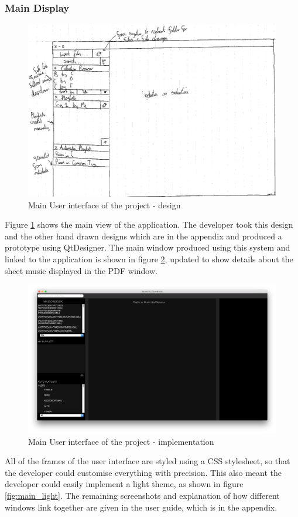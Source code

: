 \subsubsection{Main Display}
\begin{figure}[H]
\centering
    \includegraphics[width=500pt]{designs/main}
    \caption{Main User interface of the project - design}
    \label{fig:main_handdrawn}
\end{figure}
Figure \ref{fig:main_handdrawn} shows the main view of the application. The developer took this design and the other hand drawn designs which are in the appendix and produced a prototype using QtDesigner. The main window produced using this system and linked to the application is shown in figure \ref{fig:main}, updated to show details about the sheet music displayed in the PDF window. 
\begin{figure}[H]
	\centering
    \includegraphics[width=400pt]{designs/main_screenshot.png}
    \caption{Main User interface of the project - implementation}
    \label{fig:main}
\end{figure}
All of the frames of the user interface are styled using a CSS stylesheet, so that the developer could customise everything with precision. This also meant the developer could easily implement a light theme, as shown in figure \ref{fig:main_light}. The remaining screenshots and explanation of how different windows link together are given in the user guide, which is in the appendix.

